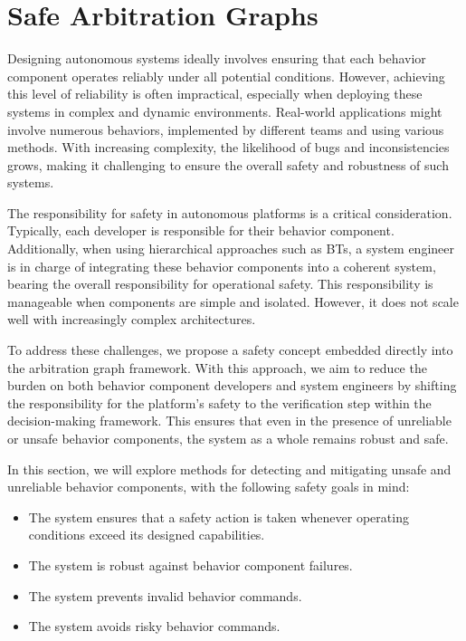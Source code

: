 \section{Safe Arbitration Graphs}

Designing autonomous systems ideally involves ensuring that each behavior component operates reliably under all potential conditions.
However, achieving this level of reliability is often impractical, especially when deploying these systems in complex and dynamic environments.
Real-world applications might involve numerous behaviors, implemented by different teams and using various methods.
With increasing complexity, the likelihood of bugs and inconsistencies grows, making it challenging to ensure the overall safety and robustness of such systems.

The responsibility for safety in autonomous platforms is a critical consideration.
Typically, each developer is responsible for their behavior component.
Additionally, when using hierarchical approaches such as \glspl{BT},
    a system engineer is in charge of integrating these behavior components into a coherent system,
    bearing the overall responsibility for operational safety.
This responsibility is manageable when components are simple and isolated.
However, it does not scale well with increasingly complex architectures.

To address these challenges, we propose a safety concept embedded directly into the arbitration graph framework.
With this approach, we aim to reduce the burden on both behavior component developers and system engineers
by shifting the responsibility for the platform's safety to the verification step within the decision-making framework.
This ensures that even in the presence of unreliable or unsafe behavior components, the system as a whole remains robust and safe.

In this section, we will explore methods for detecting and mitigating unsafe and unreliable behavior components, with the following safety goals in mind:

\begin{itemize}
    \item The system ensures that a safety action is taken whenever operating conditions exceed its designed capabilities.
    \item The system is robust against behavior component failures.
    \item The system prevents invalid behavior commands.
    \item The system avoids risky behavior commands.
\end{itemize}

